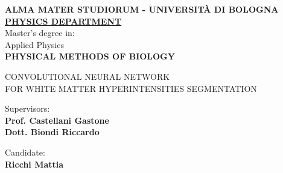 \begin{titlepage}

\begin{center}
    \large{\bf ALMA MATER STUDIORUM - UNIVERSITÀ DI BOLOGNA}
    \vspace{2mm}
    \\ \large{\bf \underline{PHYSICS DEPARTMENT}}
    \vspace{5mm}
    \\ \large{Master's degree in:}
    \vspace{5mm}
    \\ \LARGE{Applied Physics}
    \vspace{8mm}
    \\\LARGE{\bf PHYSICAL METHODS OF BIOLOGY}
\end{center}

\vspace{23mm}
\begin{center}
    {\LARGE{CONVOLUTIONAL NEURAL NETWORK \\ FOR WHITE MATTER HYPERINTENSITIES SEGMENTATION \\ \vspace{3mm} 
}}
    
\end{center}
\vspace{50mm}

\begin{minipage}[t]{0.47\textwidth}
	{\large{Supervisors:}{\normalsize\vspace{3mm}
	\bf\\ \large{Prof. Castellani Gastone} \normalsize\vspace{3mm}\bf \\ \large{Dott. Biondi Riccardo}}}
\end{minipage}
\hfill
\begin{minipage}[t]{0.47\textwidth}\raggedleft
	{\large{Candidate:}{\normalsize\vspace{3mm} \bf\\ \large{Ricchi Mattia}}}
\end{minipage}

\vspace{40mm}
\hrulefill
\\

\end{titlepage}